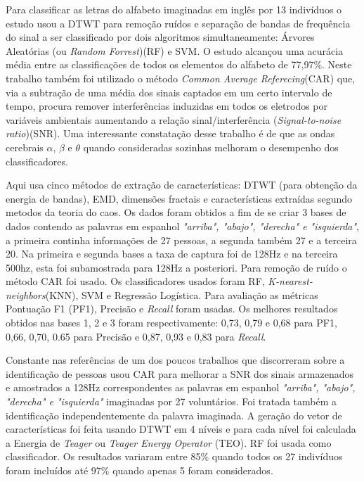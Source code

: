 			\par Para classificar as letras do alfabeto imaginadas em inglês por 13 indivíduos o estudo \cite{AgarwalPrabhakar2022Ebia} usou a DTWT para remoção ruídos e separação de bandas de frequência do sinal a ser classificado por dois algoritmos simultaneamente: Árvores Aleatórias (ou \textit{Random Forrest})(RF) e SVM. O estudo alcançou uma acurácia média entre as classificações de todos os elementos do alfabeto de 77,97\%. Neste trabalho também foi utilizado o método \textit{Common Average Referecing}(CAR) que, via a subtração de uma média dos sinais captados em um certo intervalo de tempo, procura remover interferências induzidas em todos os eletrodos por variáveis ambientais aumentando a relação sinal/interferência (\textit{Signal-to-noise ratio})(SNR). Uma interessante constatação desse trabalho é de que as ondas cerebrais $\alpha$, $\beta$ e $\theta$ quando consideradas sozinhas melhoram o desempenho dos classificadores.
			
			\par Aqui \cite{Hernandez-Del-ToroTonatiuh2021TaEB} usa cinco métodos de extração de características: DTWT (para obtenção da energia de bandas), EMD, dimensões fractais e características extraídas segundo metodos da teoria do caos. Os dados foram obtidos a fim de se criar 3 bases de dados contendo as palavras em espanhol \textit{"arriba", "abajo", "derecha" e "isquierda"}, a primeira continha informações de 27 pessoas, a segunda também 27 e a terceira 20. Na primeira e segunda bases a taxa de captura foi de 128Hz e na terceira 500hz, esta foi subamostrada para 128Hz a posteriori. Para remoção de ruído o método CAR foi usado. Os classificadores usados foram RF, \textit{K-nearest-neighbors}(KNN), SVM e Regressão Logística. Para avaliação as métricas Pontuação F1 (PF1), Precisão e \textit{Recall} foram usadas. Os melhores resultados obtidos nas bases 1, 2 e 3 foram respectivamente: 0,73, 0,79 e 0,68 para PF1, 0,66, 0,70, 0.65 para Precisão e 0,87, 0,93 e 0,83 para \textit{Recall}.
			
			\par Constante nas referências de \cite{Hernandez-Del-ToroTonatiuh2021TaEB} um dos poucos trabalhos que discorreram sobre a identificação de pessoas \cite{MOCTEZUMA2019201} usou CAR para melhorar a SNR dos sinais armazenados e amostrados a 128Hz correspondentes as palavras em espanhol \textit{"arriba", "abajo", "derecha" e "isquierda"} imaginadas por 27 voluntários. Foi tratada também a identificação independentemente da palavra imaginada. A geração do vetor de características foi feita usando DTWT em 4 níveis e para cada nível foi calculada a Energia de \textit{Teager} ou \textit{Teager Energy Operator} (TEO). RF foi usada como classificador. Os resultados variaram entre 85\% quando todos os 27 indivíduos foram incluídos até 97\% quando apenas 5 foram considerados.
			
